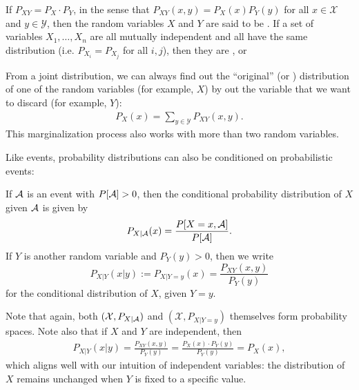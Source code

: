 If $P_{XY} = P_X \cdot P_Y$, in the sense that $P_{XY}(x,y) = P_X(x)P_Y(y)$ for all $x \in \mathcal{X}$ and $y 
\in \mathcal{Y}$, then the random variables $X$ and $Y$ are said to be . If a set of variables $X_1, \ldots, X_n$ are all mutually independent and all have the same distribution (i.e. $P_{X_i} = P_{X_j}$ for all $i,j$), then they are , or 

From a joint distribution, we can always find out the ``original'' (or ) distribution of one of the random variables (for example, $X$) by  out the variable that we want to discard (for example, $Y$):
\begin{align}
P_X(x) = \sum_{y \in \mathcal{Y}} P_{XY}(x,y).
\end{align}
This marginalization process also works with more than two random variables.

Like events, probability distributions can also be conditioned on
probabilistic events:
\begin{definition}
If $\mathcal{A}$ is an event with $P[\mathcal{A}] > 0$, then the conditional probability distribution of $X$ given $\mathcal{A}$ is given by
\[
P_{X|\mathcal{A}}(x) = \frac{P[X=x, \mathcal{A}]}{P[\mathcal{A}]}.
\]
If $Y$ is another random variable and $P_Y(y) > 0$, then we write
\[
P_{X | Y}(x| y) := P_{X | Y = y}(x) = \frac{P_{XY}(x,y)}{P_Y(y)}
\]
for the conditional distribution of $X$, given $Y = y$.
\end{definition}
Note that again, both $(\mathcal{X},P_{X | \mathcal{A}})$ and $(\mathcal{X},P_{X| Y=y})$ themselves form probability spaces. Note also that if $X$ and $Y$ are independent, then
\begin{align}
P_{X | Y}(x |y) = \frac{P_{XY}(x,y)}{P_Y(y)} = \frac{P_X(x) \cdot P_Y(y)}{P_Y(y)} = P_X(x),
\end{align}
which aligns well with our intuition of independent variables: the distribution of $X$ remains unchanged when $Y$ is fixed to a specific value.

